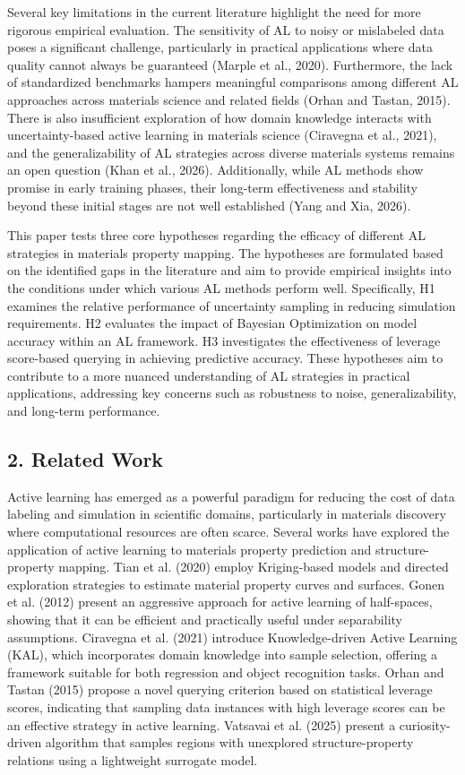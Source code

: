 Several key limitations in the current literature highlight the need for more rigorous empirical evaluation. The sensitivity of AL to noisy or mislabeled data poses a significant challenge, particularly in practical applications where data quality cannot always be guaranteed (Marple et al., 2020). Furthermore, the lack of standardized benchmarks hampers meaningful comparisons among different AL approaches across materials science and related fields (Orhan and Tastan, 2015). There is also insufficient exploration of how domain knowledge interacts with uncertainty-based active learning in materials science (Ciravegna et al., 2021), and the generalizability of AL strategies across diverse materials systems remains an open question (Khan et al., 2026). Additionally, while AL methods show promise in early training phases, their long-term effectiveness and stability beyond these initial stages are not well established (Yang and Xia, 2026).

This paper tests three core hypotheses regarding the efficacy of different AL strategies in materials property mapping. The hypotheses are formulated based on the identified gaps in the literature and aim to provide empirical insights into the conditions under which various AL methods perform well. Specifically, H1 examines the relative performance of uncertainty sampling in reducing simulation requirements. H2 evaluates the impact of Bayesian Optimization on model accuracy within an AL framework. H3 investigates the effectiveness of leverage score-based querying in achieving predictive accuracy. These hypotheses aim to contribute to a more nuanced understanding of AL strategies in practical applications, addressing key concerns such as robustness to noise, generalizability, and long-term performance.

\subsection*{2. Related Work}

Active learning has emerged as a powerful paradigm for reducing the cost of data labeling and simulation in scientific domains, particularly in materials discovery where computational resources are often scarce. Several works have explored the application of active learning to materials property prediction and structure-property mapping. Tian et al. (2020) employ Kriging-based models and directed exploration strategies to estimate material property curves and surfaces. Gonen et al. (2012) present an aggressive approach for active learning of half-spaces, showing that it can be efficient and practically useful under separability assumptions. Ciravegna et al. (2021) introduce Knowledge-driven Active Learning (KAL), which incorporates domain knowledge into sample selection, offering a framework suitable for both regression and object recognition tasks. Orhan and Tastan (2015) propose a novel querying criterion based on statistical leverage scores, indicating that sampling data instances with high leverage scores can be an effective strategy in active learning. Vatsavai et al. (2025) present a curiosity-driven algorithm that samples regions with unexplored structure-property relations using a lightweight surrogate model.

